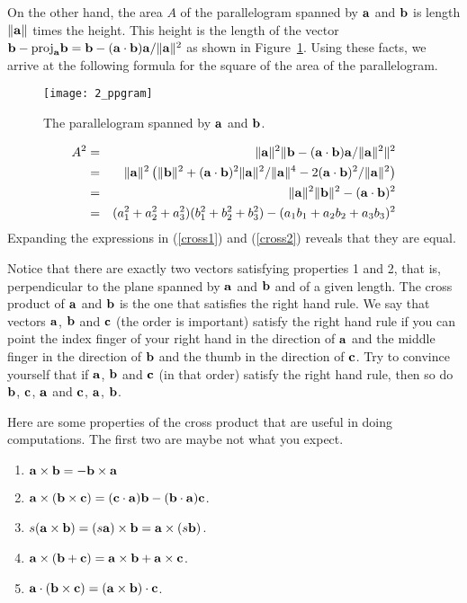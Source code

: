 On the other hand, the area $A$ of the parallelogram spanned by $\aa$ and
$\bb$ is length $\|\aa\|$ times the height. This height is the length
of the vector $\bb-{\rm proj}_{\aa}\bb = \bb - (\aa\cdot\bb)\aa/\|\aa\|^2$
as shown in Figure~\ref{fig_ppgram}.
Using these facts, we arrive at the following formula for the square
of the area of the parallelogram. 

\begin{figure}
\centerline{\texttt{[image: 2\_ppgram]}}
\caption{The parallelogram spanned by $\aa$ and $\bb$. \label{fig_ppgram}}
\end{figure}

\begin{eqnarray}
\nonumber 
A^2 & = & \|\aa\|^2\| \bb - (\aa\cdot\bb)\aa/\|\aa\|^2\|^2 \\
\nonumber 
    & = & \|\aa\|^2\left(
          \|\bb\|^2 + (\aa\cdot\bb)^2\|\aa\|^2/\|\aa\|^4 -
          2(\aa\cdot\bb)^2/\|\aa\|^2\right) \\
\nonumber 
    & = & \|\aa\|^2\|\bb\|^2 - (\aa\cdot\bb)^2 \\
\label{cross2}
    & = & (a_1^2+a_2^2+a_3^2)(b_1^2+b_2^2+b_3^2)-(a_1b_1+a_2b_2+a_3b_3)^2
\end{eqnarray}
Expanding the expressions in (\ref{cross1}) and (\ref{cross2}) reveals
that they are equal.

Notice that there are exactly two vectors satisfying properties 1 and
2, that is, perpendicular to the plane spanned by $\aa$ and $\bb$ and
of a given length. The cross product of $\aa$ and $\bb$ is the one
that satisfies the right hand rule. We say that vectors $\aa$, $\bb$
and $\cc$ (the order is important) satisfy the right hand rule if you
can point the index finger of your right hand in the direction of
$\aa$ and the middle finger in the direction of $\bb$ and the thumb in
the direction of $\cc$.  Try to convince yourself that if $\aa$, $\bb$
and $\cc$ (in that order) satisfy the right hand rule, then so do
$\bb$, $\cc$, $\aa$ and $\cc$, $\aa$, $\bb$.

Here are some properties of the cross product that are useful in doing
computations. The first two are maybe not what you expect.
\begin{enumerate}
\item $\aa\times\bb=-\bb\times\aa$
\item $\aa\times(\bb\times\cc)=(\cc\cdot\aa)\bb-(\bb\cdot\aa)\cc$.
\item $s(\aa\times\bb)=(s\aa)\times\bb=\aa\times(s\bb)$.
\item $\aa\times(\bb+\cc) = \aa\times\bb + \aa\times\cc$.
\item $\aa\cdot(\bb\times\cc)=(\aa\times\bb)\cdot\cc$.
\end{enumerate}


